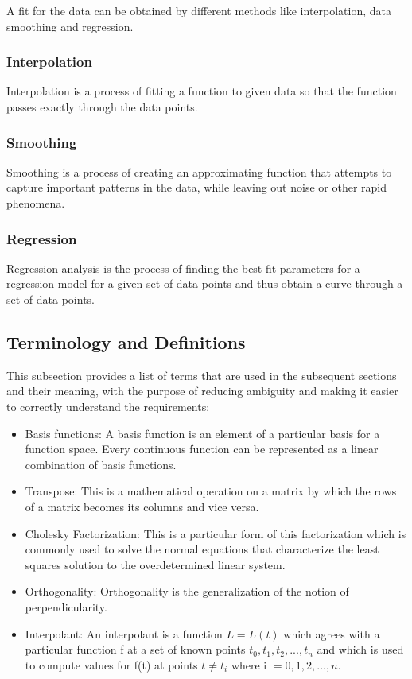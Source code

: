 \documentclass[12pt]{article}
\begin{document}
A fit for the data can be obtained by different methods like interpolation, data smoothing and regression.

\subsubsection{Interpolation}
Interpolation is a process of fitting a function to given data so that the function passes exactly through the data points.

\subsubsection{Smoothing}
Smoothing is a process of creating an approximating function that attempts to capture important patterns in the data, while leaving out noise or other rapid phenomena.

\subsubsection{Regression}
Regression analysis is the process of finding the best fit parameters for a regression model for a given set of data points and thus obtain a curve through a set of data points.

\subsection{Terminology and  Definitions}

This subsection provides a list of terms that are used in the subsequent
sections and their meaning, with the purpose of reducing ambiguity and making it
easier to correctly understand the requirements:

\begin{itemize}

\item Basis functions: A basis function is an element of a particular basis for a function space. Every continuous function can be represented as a linear combination of basis functions.

\item Transpose: This is a mathematical operation on a matrix by which the rows of a matrix becomes its columns and vice versa.

\item Cholesky Factorization: This is a particular form of this factorization which is commonly used to solve the normal equations that characterize the least squares solution to the overdetermined linear system.

\item Orthogonality: Orthogonality is the generalization of the notion of perpendicularity.

\item Interpolant: An interpolant is a function $L=L(t)$ which agrees with a particular function f at a set of known points $t_0,t_1,t_2,...,t_n$ and which is used to compute values for f(t) at points $t \neq t_i$ where i $=0,1,2,...,n$.

\end{itemize}
\end{document}
